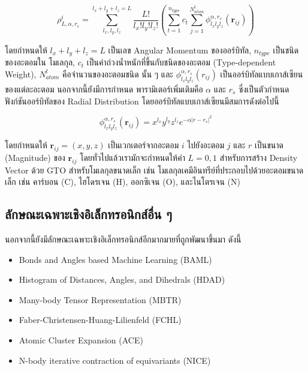 \begin{equation}\label{eq:gto_density}
    \rho^{i}_{L,\alpha,r_{s}} = \sum^{l_{x}+l_{y}+l_{z} = L}_{l_{x},l_{y},l_{z}} 
    \frac{L!}{l_{x}!l_{y}!l_{z}!} \left ( \sum^{n_{type}}_{t=1} c_{t} \sum^{N^{t}_{atom}}_{j=1} 
    \phi^{\alpha,r_{s}}_{l_{x}l_{y}l_{z}} (\bm{r}_{ij}) \right )
\end{equation}

\noindent โดยกำหนดให้ $l_{x}+l_{y}+l_{z} = L$ เป็นเลข Angular Momentum ของออร์บิทัล, $n_{type}$ เป็นชนิดของอะตอมใน%
โมเลกุล, $c_{t}$ เป็นค่าถ่วงน้ำหนักที่ขึ้นกับชนิดของอะตอม (Type-dependent Weight), $N^{t}_{atom}$ คือจำนวนของอะตอมชนิด%
นั้น ๆ และ $\phi^{\alpha,r_{s}}_{l_{x}l_{y}l_{z}} (r_{ij})$ เป็นออร์บิทัลแบบเกาส์เซียนของแต่ละอะตอม นอกจากนี้ยังมีการกำหนด%
พารามิเตอร์เพิ่มเติมคือ $\alpha$ และ $r_{s}$ ซึ่งเป็นตัวกำหนดฟังก์ชันออร์บิทัลของ Radial Distribution\autocite{kwac2021} 
โดยออร์บิทัลแบบเกาส์เซียนมีสมการดังต่อไปนี้

\begin{equation}\label{eq:gaussian_orb}
    \phi^{\alpha,r_{s}}_{l_{x}l_{y}l_{z}} (\bm{r}_{ij}) = x^{l_{x}}y^{l_{y}}z^{l_{z}} e^{-\alpha 
    |r-r_{s}|^{2}}
\end{equation}

\noindent โดยกำหนดให้ $\bm{r}_{ij} = (x,y,z)$ เป็นเวกเตอร์จากอะตอม $i$ ไปยังอะตอม $j$ และ $r$ เป็นขนาด (Magnitude) 
ของ $\bm{r}_{ij}$ โดยทั่วไปแล้วเรามักจะกำหนดให้ค่า $L=0,1$ สำหรับการสร้าง Density Vector ด้วย GTO สำหรับโมเลกุลขนาดเล็ก 
เช่น โมเลกุลเคมีอินทรีย์ที่ประกอบไปด้วยอะตอมขนาดเล็ก เช่น คาร์บอน (C), ไฮโดรเจน (H), ออกซิเจน (O), และไนโตรเจน (N)

\subsection{ลักษณะเฉพาะเชิงอิเล็กทรอนิกส์อื่น ๆ}
\label{ssec:other_feat_elec}

นอกจากนี้ยังมีลักษณะเฉพาะเชิงอิเล็กทรอนิกส์อีกมากมายที่ถูกพัฒนาขึ้นมา\autocite{faber2018} ดังนี้ 

\begin{itemize}[topsep=0pt]
    \item Bonds and Angles based Machine Learning (BAML)\autocite{huang2016}

    \item Histogram of Distances, Angles, and Dihedrals (HDAD)\autocite{faber2017}

    \item Many-body Tensor Representation (MBTR)\autocite{huo2022,langer2022}
    
    \item Faber-Christensen-Huang-Lilienfeld (FCHL)\autocite{faber2018}
    
    \item Atomic Cluster Expansion (ACE)\autocite{drautz2019,kovacs2021}
    
    \item N-body iterative contraction of equivariants (NICE)\autocite{nigam2020}
\end{itemize}

